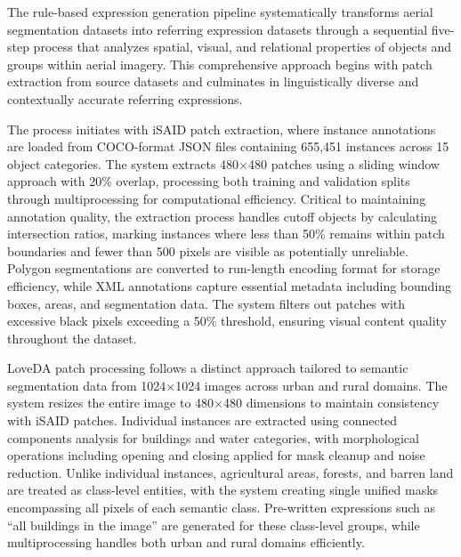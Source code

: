 The rule-based expression generation pipeline systematically transforms aerial segmentation datasets into referring expression datasets through a sequential five-step process that analyzes spatial, visual, and relational properties of objects and groups within aerial imagery. This comprehensive approach begins with patch extraction from source datasets and culminates in linguistically diverse and contextually accurate referring expressions.

The process initiates with iSAID patch extraction, where instance annotations are loaded from COCO-format JSON files containing 655,451 instances across 15 object categories. The system extracts 480$\times$480 patches using a sliding window approach with 20\% overlap, processing both training and validation splits through multiprocessing for computational efficiency. Critical to maintaining annotation quality, the extraction process handles cutoff objects by calculating intersection ratios, marking instances where less than 50\% remains within patch boundaries and fewer than 500 pixels are visible as potentially unreliable. Polygon segmentations are converted to run-length encoding format for storage efficiency, while XML annotations capture essential metadata including bounding boxes, areas, and segmentation data. The system filters out patches with excessive black pixels exceeding a 50\% threshold, ensuring visual content quality throughout the dataset.

LoveDA patch processing follows a distinct approach tailored to semantic segmentation data from 1024$\times$1024 images across urban and rural domains. The system resizes the entire image to 480$\times$480 dimensions to maintain consistency with iSAID patches. Individual instances are extracted using connected components analysis for buildings and water categories, with morphological operations including opening and closing applied for mask cleanup and noise reduction. Unlike individual instances, agricultural areas, forests, and barren land are treated as class-level entities, with the system creating single unified masks encompassing all pixels of each semantic class. Pre-written expressions such as ``all buildings in the image'' are generated for these class-level groups, while multiprocessing handles both urban and rural domains efficiently.

